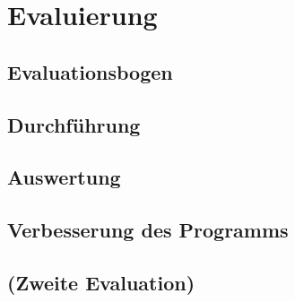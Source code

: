 \section{Evaluierung}
\subsection{Evaluationsbogen}
\subsection{Durchführung}
\subsection{Auswertung}
\subsection{Verbesserung des Programms}
\subsection{(Zweite Evaluation)}